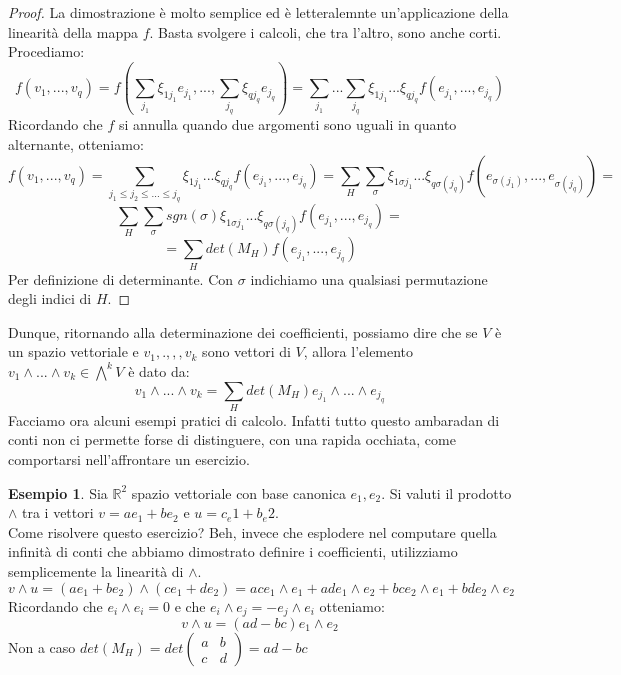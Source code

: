 \documentclass[12pt,a4paper]{report}
\theoremstyle{definition}
\theoremstyle{Theorem}
\theoremstyle{definition}
\newtheorem{Ex}[Def]{Esempio}
\theoremstyle{definition}
\theoremstyle{definition}
\begin{document}
	\begin{proof}
		La dimostrazione è molto semplice ed è letteralemnte un'applicazione della linearità della mappa $f$. Basta svolgere i calcoli, che tra l'altro, sono anche corti. Procediamo:
		$$f(v_1,...,v_q)=f(\sum_{j_1}\xi_{1j_1}e_{j_1},...,\sum_{j_q}\xi_{qj_q}e_{j_q})=\sum_{j_1}...\sum_{j_q}\xi_{1j_1}...\xi_{qj_q}f(e_{j_1},...,e_{j_q})$$
		Ricordando che $f$ si annulla quando due argomenti sono uguali in quanto alternante, otteniamo:
		$$f(v_1,...,v_q)=\sum_{j_1\le j_2\le...\le j_q}\xi_{1j_1}...\xi_{qj_q}f(e_{j_1},...,e_{j_q})=
		\sum_{H}\sum_{\sigma}\xi_{1\sigma{j_1}}...\xi_{q\sigma(j_q)}f(e_{\sigma(j_1)},...,e_{\sigma(j_q)})=$$
		$$\sum_{H}\sum_{\sigma}sgn(\sigma)\xi_{1\sigma{j_1}}...\xi_{q\sigma(j_q)}f(e_{j_1},...,e_{j_q})=$$
		$$
		=\sum_{H}det(M_H)f(e_{j_1},...,e_{j_q})$$
		Per definizione di determinante. Con $\sigma$ indichiamo una qualsiasi permutazione degli indici di $H$.
	\end{proof}
	Dunque, ritornando alla determinazione dei coefficienti, possiamo dire che se $V$ è un spazio vettoriale e $v_1,.,,,v_k$ sono vettori di $V$, allora l'elemento $v_1\wedge...\wedge v_k\in \bigwedge^kV$ è dato da:
	$$v_1\wedge...\wedge v_k=\sum_{H}det(M_H)e_{j_1}\wedge...\wedge e_{j_q}$$
	Facciamo ora alcuni esempi pratici di calcolo. Infatti tutto questo ambaradan di conti non ci permette forse di distinguere, con una rapida occhiata, come comportarsi nell'affrontare un esercizio.
	\begin{Ex}
		Sia $\mathbb{R}^2$ spazio vettoriale con base canonica $e_1,e_2$. Si valuti il prodotto $\wedge$ tra i vettori $v=ae_1+be_2$ e $u=c_e1+b_e2$.\\
		Come risolvere questo esercizio? Beh, invece che esplodere nel computare quella infinità di conti che abbiamo dimostrato definire i coefficienti, utilizziamo semplicemente la linearità di $\wedge$.
		$$v\wedge u=(ae_1+be_2)\wedge(ce_1+de_2)=ace_1\wedge e_1+ade_1\wedge e_2+bce_2\wedge e_1+bde_2\wedge e_2$$ 
		Ricordando che $e_i\wedge e_i=0$ e che $e_i\wedge e_j=-e_j\wedge e_i$ otteniamo:
		$$v\wedge u=(ad-bc)e_1\wedge e_2$$
		Non a caso $det(M_H)=det\begin{pmatrix}
			a&b\\c&d
		\end{pmatrix}=ad-bc$
	\end{Ex}
\end{document}
